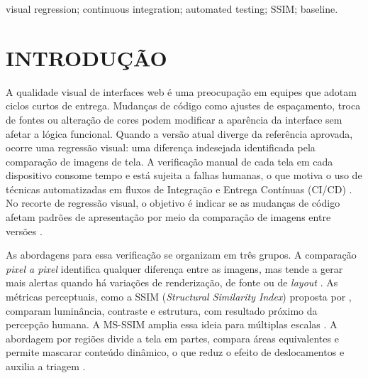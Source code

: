\documentclass{UNESC}
\begin{document}
\vspace{1pt}

\begin{keywordsenglish}
{visual regression; continuous integration; automated testing; SSIM; baseline.}
\end{keywordsenglish}


\section{INTRODUÇÃO}

A qualidade visual de interfaces web é uma preocupação em equipes que adotam ciclos curtos de entrega. Mudanças de código como ajustes de espaçamento, troca de fontes ou alteração de cores podem modificar a aparência da interface sem afetar a lógica funcional. Quando a versão atual diverge da referência aprovada, ocorre uma regressão visual: uma diferença indesejada identificada pela comparação de imagens de tela. A verificação manual de cada tela em cada dispositivo consome tempo e está sujeita a falhas humanas, o que motiva o uso de técnicas automatizadas em fluxos de Integração e Entrega Contínuas (CI/CD) \cite{shahin2017}. No recorte de regressão visual, o objetivo é indicar se as mudanças de código afetam padrões de apresentação por meio da comparação de imagens entre versões \cite{tanno2020,figueiredo2018,bordignon2019}.

As abordagens para essa verificação se organizam em três grupos. A comparação \emph{pixel a pixel} identifica qualquer diferença entre as imagens, mas tende a gerar mais alertas quando há variações de renderização, de fonte ou de \emph{layout} \cite{figueiredo2018,tanno2020}. As métricas perceptuais, como a SSIM (\emph{Structural Similarity Index}) proposta por , comparam luminância, contraste e estrutura, com resultado próximo da percepção humana. A MS-SSIM amplia essa ideia para múltiplas escalas \cite{wang2003msssim}. A abordagem por regiões divide a tela em partes, compara áreas equivalentes e permite mascarar conteúdo dinâmico, o que reduz o efeito de deslocamentos e auxilia a triagem \cite{tanno2020}.
\end{document}
